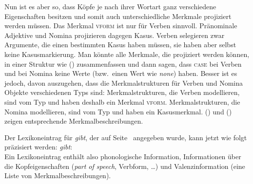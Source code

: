 \ea
\z
Nun ist es aber so, dass Köpfe je nach ihrer Wortart ganz verschiedene Eigenschaften
besitzen und somit auch unterschiedliche Merkmale projiziert werden müssen.
Das Merkmal \textsc{vform} ist nur für Verben sinnvoll. Pränominale Adjektive und 
Nomina projizieren dagegen Kasus. Verben selegieren zwar Argumente, die einen
bestimmten Kasus haben müssen, sie haben aber selbst keine Kasusmarkierung.
Man könnte alle Merkmale, die projiziert werden können, in einer Struktur wie
() zusammenfassen und dann sagen, dass \textsc{case} bei Verben und \vform
bei Nomina keine Werte (bzw.\ einen Wert wie \emph{none}) haben.
\ea
\z
Besser ist es jedoch, davon auszugehen, dass die Merkmalstrukturen für
Verben und Nomina Objekte verschiedenen Typs sind: Merkmalstrukturen,
die Verben modellieren, sind vom Typ  und haben deshalb
ein Merkmal \textsc{vform}. Merkmalstrukturen, die Nomina modellieren,
sind vom Typ  und haben ein
Kasusmerkmal\label{page-ref-case-feat}. () und () zeigen entsprechende
Merkmalbeschreibungen.
\ea
{}
\z
\ea
\z

\noindent
Der Lexikoneintrag für \emph{gibt}, der auf Seite~\pageref{le-gibt-1}
angegeben wurde, kann jetzt wie folgt präzisiert werden:
\ea
\textit{gibt\/}:\\
\z
Ein Lexikoneintrag enthält also phonologische Information, Informationen über die Kopfeigenschaften (\emph{part of speech}, Verbform, \ldots)
und Valenzinformation (eine Liste von Merkmalbeschreibungen).

